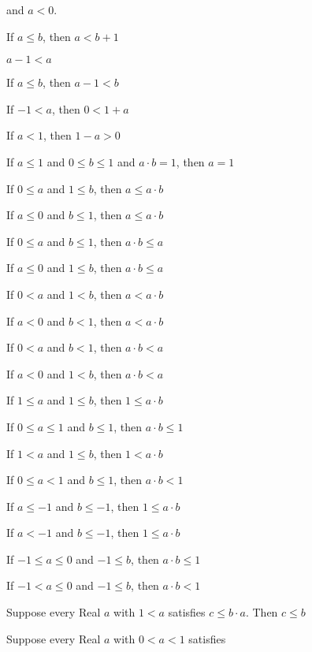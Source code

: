 \documentclass{article}
\let\xrbreak\medbreak
\begin{document}
\begin{thm}
  and $a<0$.
  \xrbreak
\item\label{xreal1:145} If $a\leq b$, then $a<b+1$
\item\label{xreal1:146} $a-1<a$
\item\label{xreal1:147} If $a\leq b$, then $a-1<b$
\item\label{xreal1:148} If $-1<a$, then $0<1+a$
\item\label{xreal1:149} If $a<1$, then $1-a>0$
  \xrbreak
\item\label{xreal1:150} If $a\leq1$ and $0\leq b\leq 1$ and $a\cdot b=1$,
  then $a=1$
\item\label{xreal1:151} If $0\leq a$ and $1\leq b$, then $a\leq a\cdot b$
\item\label{xreal1:152} If $a\leq0$ and $b\leq1$, then $a\leq a\cdot b$
\item\label{xreal1:153} If $0\leq a$ and $b\leq1$, then $a\cdot b\leq a$
\item\label{xreal1:154} If $a\leq0$ and $1\leq b$, then $a\cdot b\leq a$
\item\label{xreal1:155} If $0<a$ and $1<b$, then $a<a\cdot b$
\item\label{xreal1:156} If $a<0$ and $b<1$, then $a<a\cdot b$
\item\label{xreal1:157} If $0<a$ and $b<1$, then $a\cdot b<a$
\item\label{xreal1:158} If $a<0$ and $1<b$, then $a\cdot b<a$
\item\label{xreal1:159} If $1\leq a$ and $1\leq b$, then $1\leq a\cdot b$
\item\label{xreal1:160} If $0\leq a\leq1$ and $b\leq 1$, then $a\cdot b\leq1$
\item\label{xreal1:161} If $1<a$ and $1\leq b$, then $1<a\cdot b$
\item\label{xreal1:162} If $0\leq a<1$ and $b\leq1$, then $a\cdot b<1$
\item\label{xreal1:163} If $a\leq-1$ and $b\leq-1$, then $1\leq a\cdot b$
\item\label{xreal1:164} If $a<-1$ and $b\leq-1$, then $1\leq a\cdot b$
\item\label{xreal1:165} If $-1\leq a\leq 0$ and $-1\leq b$, then $a\cdot b\leq1$
\item\label{xreal1:166} If $-1<a\leq0$ and $-1\leq b$, then $a\cdot b<1$
  \xrbreak
\item\label{xreal1:167} Suppose every Real $a$ with $1<a$ satisfies
  $c\leq b\cdot a$. Then $c\leq b$
\item\label{xreal1:168} Suppose every Real $a$ with $0<a<1$ satisfies

\end{thm}
\end{document}
